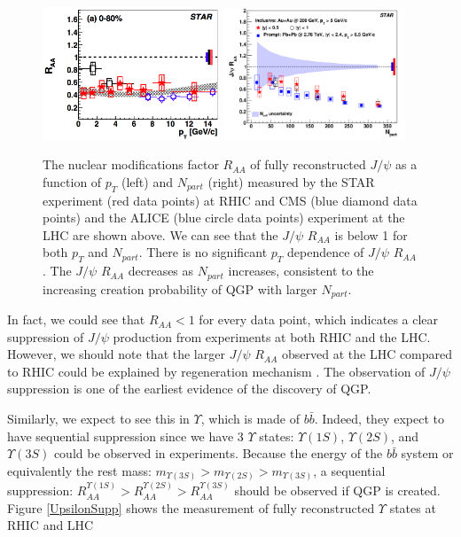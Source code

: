 \begin{figure}[hbtp]
\begin{center}
\includegraphics[width=0.47\textwidth]{Figures/Chapter1/STARPt.png}
\includegraphics[width=0.487\textwidth]{Figures/Chapter1/STARNPart.png}
\caption{The nuclear modifications factor $R_{AA}$ of fully reconstructed $J/\psi$ as a function of $p_{T}$ (left) and $N_{part}$ (right) measured by the STAR experiment (red data points) at RHIC and CMS (blue diamond data points) and the ALICE (blue circle data points) experiment at the LHC are shown above. We can see that the $J/\psi$ $R_{AA}$ is below 1 for both $p_T$ and $N_{part}$. There is no significant $p_T$ dependence of $J/\psi$ $R_{AA}$. The $J/\psi$ $R_{AA}$ decreases as $N_{part}$ increases, consistent to the increasing creation probability of QGP with larger $N_{part}$.}
\label{JPsiSupp}
\end{center}
\end{figure} 

In fact, we could see that $R_{AA} < 1$ for every data point, which indicates a clear suppression of $J/\psi$ production from experiments at both RHIC and the LHC. However, we should note that the larger $J/\psi$ $R_{AA}$ observed at the LHC compared to RHIC could be explained by regeneration mechanism \cite{JPsiRegen}. The observation of $J/\psi$ suppression is one of the earliest evidence of the discovery of QGP.

Similarly, we expect to see this in $\Upsilon$, which is made of $b \bar b$. Indeed, they expect to have sequential suppression since we have 3 $\Upsilon$ states: $\Upsilon(1S)$,  $\Upsilon(2S)$, and $\Upsilon(3S)$  could be observed in experiments. Because the energy of the $b \bar b$ system or equivalently the rest mass: $m_{\Upsilon(3S)} > m_{\Upsilon(2S)} > m_{\Upsilon(3S)}$, a sequential suppression: $R_{AA}^{\Upsilon(1S)} > R_{AA}^{\Upsilon(2S)} > R_{AA}^{\Upsilon(3S)}$ should be observed if QGP is created. Figure \ref{UpsilonSupp} shows the measurement of fully reconstructed $\Upsilon$ states at RHIC and LHC \cite{STARUpsilonRef,CMSUpsilonRef}

